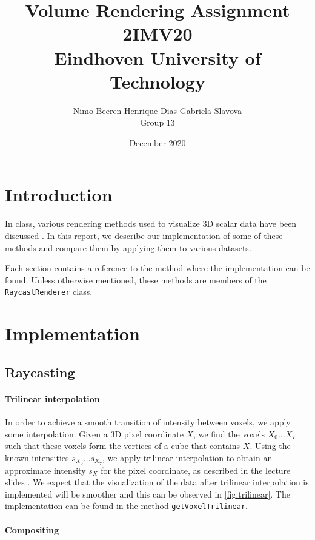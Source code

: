 \documentclass[a4paper]{article}
\title{Volume Rendering Assignment\\2IMV20\\Eindhoven University of Technology}
\author{Nimo Beeren \quad Henrique Dias \quad Gabriela Slavova\\Group 13}
\date{December 2020}
\begin{document}
\maketitle

\section{Introduction}

In class, various rendering methods used to visualize 3D scalar data have been discussed \citep{2imv20_2}. In this report, we describe our implementation of some of these methods and compare them by applying them to various datasets.

Each section contains a reference to the method where the implementation can be found. Unless otherwise mentioned, these methods are members of the {\tt RaycastRenderer} class.

\section{Implementation}

\subsection{Raycasting}
\label{subsec:raycasting}

\paragraph{Trilinear interpolation}

In order to achieve a smooth transition of intensity between voxels, we apply some interpolation. Given a 3D pixel coordinate $X$, we find the voxels $X_0 \ldots X_7$ such that these voxels form the vertices of a cube that contains $X$. Using the known intensities $s_{X_0}\ldots s_{X_7}$, we apply trilinear interpolation to obtain an approximate intensity $s_X$ for the pixel coordinate, as described in the lecture slides \citep{2imv20_2}. We expect that the visualization of the data after trilinear interpolation is implemented will be smoother and this can be observed in \autoref{fig:trilinear}. The implementation can be found in the method {\tt getVoxelTrilinear}.

\paragraph{Compositing}
\label{ray_composite}
\end{document}
